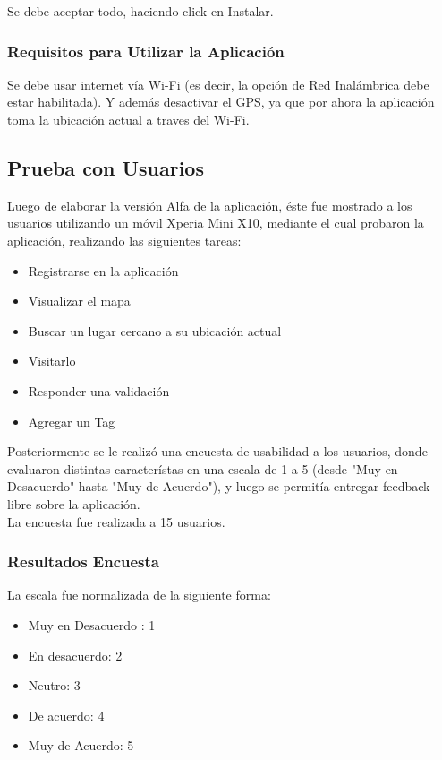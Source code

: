\documentclass[10pt,letterpaper]{article}
\begin{document}
Se debe aceptar todo, haciendo click en Instalar.

\subsubsection{Requisitos para Utilizar la Aplicación}

Se debe usar internet vía Wi-Fi (es decir, la opción de Red Inalámbrica debe estar habilitada). Y además desactivar el GPS, ya que por ahora la aplicación toma la ubicación actual a traves del Wi-Fi.

\subsection{Prueba con Usuarios}

Luego de elaborar la versión Alfa de la aplicación, éste fue mostrado a los usuarios utilizando un móvil Xperia Mini X10, mediante el cual probaron la aplicación, realizando las siguientes tareas:\\

\begin{itemize}
 \item Registrarse en la aplicación
 \item Visualizar el mapa
 \item Buscar un lugar cercano a su ubicación actual
 \item Visitarlo
 \item Responder una validación
 \item Agregar un Tag
\end{itemize}


Posteriormente se le realizó una encuesta de usabilidad a los usuarios, donde evaluaron distintas característas en una escala de 1 a 5 (desde "Muy en Desacuerdo" hasta "Muy de Acuerdo"), y luego se permitía entregar feedback libre sobre la aplicación.\\

La encuesta fue realizada a 15 usuarios.\\

\subsubsection{Resultados Encuesta}

La escala fue normalizada de la siguiente forma:

\begin{itemize}
\item Muy en Desacuerdo : 1
\item En desacuerdo: 2
\item Neutro: 3
\item De acuerdo: 4
\item Muy de Acuerdo: 5
\end{itemize}
\end{document}
